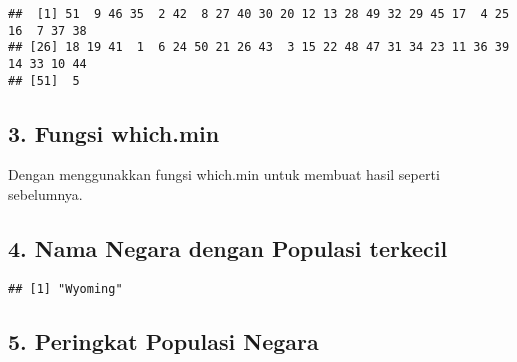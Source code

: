 \documentclass[
]{article}
\newenvironment{Shaded}{\begin{snugshade}}{\end{snugshade}}
\newcommand{\DataTypeTok}[1]{\textcolor[rgb]{0.13,0.29,0.53}{#1}}
\newcommand{\KeywordTok}[1]{\textcolor[rgb]{0.13,0.29,0.53}{\textbf{#1}}}
\newcommand{\NormalTok}[1]{#1}
\newcommand{\OperatorTok}[1]{\textcolor[rgb]{0.81,0.36,0.00}{\textbf{#1}}}
\newcommand{\StringTok}[1]{\textcolor[rgb]{0.31,0.60,0.02}{#1}}
\begin{document}
\begin{verbatim}
##  [1] 51  9 46 35  2 42  8 27 40 30 20 12 13 28 49 32 29 45 17  4 25 16  7 37 38
## [26] 18 19 41  1  6 24 50 21 26 43  3 15 22 48 47 31 34 23 11 36 39 14 33 10 44
## [51]  5
\end{verbatim}

\hypertarget{fungsi-which.min}{%
\subsection{3. Fungsi which.min}\label{fungsi-which.min}}

Dengan menggunakkan fungsi which.min untuk membuat hasil seperti
sebelumnya.

\begin{Shaded}
\end{Shaded}

\hypertarget{nama-negara-dengan-populasi-terkecil}{%
\subsection{4. Nama Negara dengan Populasi
terkecil}\label{nama-negara-dengan-populasi-terkecil}}

\begin{Shaded}
\end{Shaded}

\begin{verbatim}
## [1] "Wyoming"
\end{verbatim}

\hypertarget{peringkat-populasi-negara}{%
\subsection{5. Peringkat Populasi
Negara}\label{peringkat-populasi-negara}}

\begin{Shaded}
\end{Shaded}
\end{document}
